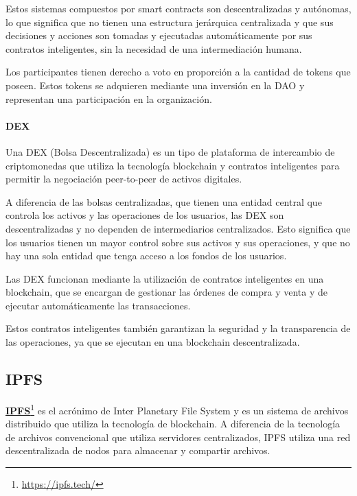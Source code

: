 \bigskip

Estos sistemas compuestos por smart contracts son descentralizadas y autónomas, lo que significa que no tienen una estructura jerárquica centralizada y que sus decisiones y acciones son tomadas y ejecutadas automáticamente por sus contratos inteligentes, sin la necesidad de una intermediación humana.

\bigskip

Los participantes tienen derecho a voto en proporción a la cantidad de tokens que poseen. Estos tokens se adquieren mediante una inversión en la DAO y representan una participación en la organización.

\paragraph{DEX}

Una DEX (Bolsa Descentralizada) es un tipo de plataforma de intercambio de criptomonedas que utiliza la tecnología blockchain y contratos inteligentes para permitir la negociación peer-to-peer de activos digitales.

\bigskip

A diferencia de las bolsas centralizadas, que tienen una entidad central que controla los activos y las operaciones de los usuarios, las DEX son descentralizadas y no dependen de intermediarios centralizados. Esto significa que los usuarios tienen un mayor control sobre sus activos y sus operaciones, y que no hay una sola entidad que tenga acceso a los fondos de los usuarios.

\bigskip

Las DEX funcionan mediante la utilización de contratos inteligentes en una blockchain, que se encargan de gestionar las órdenes de compra y venta y de ejecutar automáticamente las transacciones.

\bigskip

Estos contratos inteligentes también garantizan la seguridad y la transparencia de las operaciones, ya que se ejecutan en una blockchain descentralizada.

\newpage

\subsection{IPFS}

\textcolor{blue}{\href{https://ipfs.tech/}{\textbf{IPFS}}}\footnote{\url{https://ipfs.tech/}} es el acrónimo de Inter Planetary File System y es un sistema de archivos distribuido que utiliza la tecnología de blockchain. A diferencia de la tecnología de archivos convencional que utiliza servidores centralizados, IPFS utiliza una red descentralizada de nodos para almacenar y compartir archivos.

